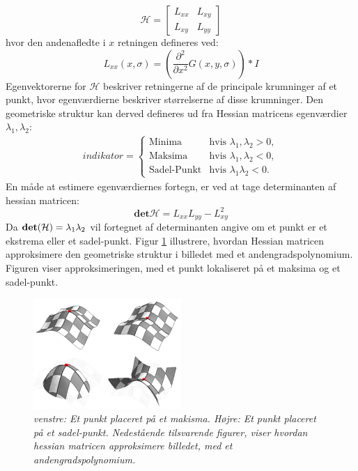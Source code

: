 \begin{equation}
\mathcal{H} = 
 \begin{bmatrix}
 	L_{xx} & L_{xy} \\
 	L_{xy} & L_{yy}
 \end{bmatrix}
 \label{hessianmatrixblob}
\end{equation}
hvor den andenafledte i $x$ retningen defineres ved:
\begin{equation}
L_{xx}(x, \sigma) = (\frac{\partial^2 }{\partial x^2 } G(x,y,\sigma)) * I
\label{lxx}
\end{equation}
Egenvektorerne for $\mathcal{H}$ beskriver retningerne af de principale krumninger af et punkt, hvor egenværdierne beskriver størrelserne af disse krumninger. Den geometriske struktur kan derved defineres ud fra Hessian matricens egenværdier $\lambda_1, \lambda_2$:
\begin{equation}
\begin{split}
indikator = 
\begin{cases}
\text{Minima} & \text{hvis } \lambda_1, \lambda_2 > 0, \\
\text{Maksima}& \text{hvis } \lambda_1, \lambda_2 < 0,  \\
\text{Sadel-Punkt} & \text{hvis } \lambda_1 \lambda_2 < 0.
\end{cases}
\end{split}
\label{maxsurp}
\end{equation}
En måde at estimere egenværdiernes fortegn, er ved at tage determinanten af hessian matricen:
\begin{equation}
\textbf{det}\mathcal{H} = L_{xx}L_{yy}-L_{xy}^2
\label{detofhessian}
\end{equation}
Da $\bold{det}(\mathcal{H})=\lambda_1 \lambda_2$ vil fortegnet af determinanten angive om et punkt er et ekstrema eller et sadel-punkt. Figur \ref{fig:makssad} illustrere, hvordan Hessian matricen approksimere den geometriske struktur i billedet med et andengradspolynomium. Figuren viser approksimeringen, med et punkt lokaliseret på et maksima og et sadel-punkt.
\begin{figure}[H]
    \centering
    \includegraphics[width=0.50\textwidth]{fig/41.png}
    \vspace{-0.5em}
    \begin{center}
    \caption{{\footnotesize \textit{venstre: Et punkt placeret på et makisma. Højre: Et punkt placeret på et sadel-punkt. Nedestående tilsvarende figurer, viser hvordan hessian matricen approksimere billedet, med et andengradspolynomium. 
}}}
    \label{fig:makssad}
     \end{center}
  \end{figure}
